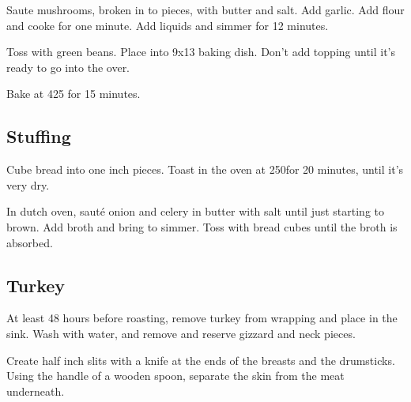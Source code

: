 \begin{recipe}
Saute mushrooms, broken in to pieces, with butter and salt. Add garlic. Add flour and cooke for one minute. Add liquids and simmer for 12 minutes.

Toss with green beans. Place into 9x13 baking dish. Don't add topping until it's ready to go into the over.

Bake at 425 for 15 minutes.

\subsection{Stuffing}



Cube bread into one inch pieces. Toast in the oven at 250\degree for 20 minutes, until it's very dry.



In dutch oven, sauté onion and celery in butter with salt until just starting to brown. Add broth and bring to simmer. Toss with bread cubes until the broth is absorbed.

\subsection{Turkey}



At least 48 hours before roasting, remove turkey from wrapping and place in the sink. Wash with water, and remove and reserve gizzard and neck pieces.

Create half inch slits with a knife at the ends of the breasts and the drumsticks. Using the handle of a wooden spoon, separate the skin from the meat underneath.


\end{recipe}

